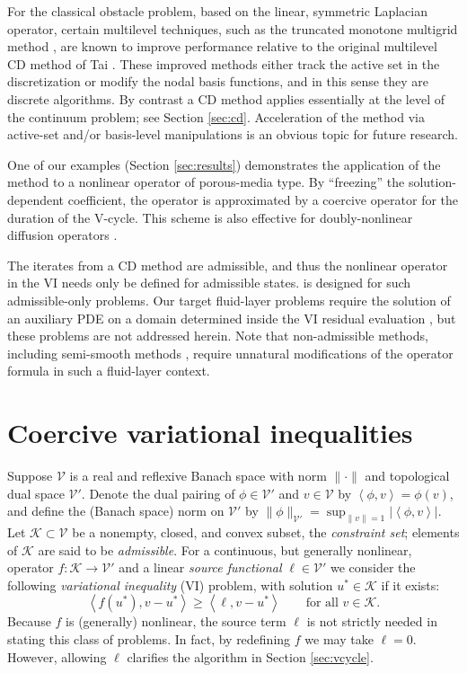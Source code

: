 \documentclass[letterpaper,final,12pt,reqno]{amsart}
\theoremstyle{cstyle}
\theoremstyle{cstyle*}
\theoremstyle{dstyle}
\numberwithin{equation}{section}
\numberwithin{figure}{section}
\numberwithin{table}{section}
\numberwithin{theorem}{section}
\newcommand{\cK}{\mathcal{K}}
\newcommand{\cV}{\mathcal{V}}
\newcommand{\ip}[2]{\left<#1,#2\right>}
\begin{document}
For the classical obstacle problem, based on the linear, symmetric Laplacian operator, certain multilevel techniques, such as the truncated monotone multigrid method \cite{GraeserKornhuber2009,Kornhuber1994}, are known to improve performance relative to the original multilevel CD method of Tai \cite{Tai2003}.  These improved methods either track the active set in the discretization or modify the nodal basis functions, and in this sense they are discrete algorithms.  By contrast a CD method applies essentially at the level of the continuum problem; see Section \ref{sec:cd}.  Acceleration of the  method via active-set and/or basis-level manipulations is an obvious topic for future research.

One of our examples (Section \ref{sec:results}) demonstrates the application of the  method to a nonlinear operator of porous-media type.  By ``freezing'' the solution-dependent coefficient, the operator is approximated by a coercive operator for the duration of the V-cycle.  This scheme is also effective for doubly-nonlinear diffusion operators \cite[for example]{Bueler2021conservation,Calvoetal2002}.

The iterates from a CD method are admissible, and thus the nonlinear operator in the VI needs only be defined for admissible states.   is designed for such admissible-only problems.  Our target fluid-layer problems require the solution of an auxiliary PDE on a domain determined inside the VI residual evaluation \cite{Bueler2021conservation}, but these problems are not addressed herein.  Note that non-admissible methods, including semi-smooth methods \cite{BensonMunson2006}, require unnatural modifications of the operator formula in such a fluid-layer context.


\section{Coercive variational inequalities} \label{sec:vi}

Suppose $\cV$ is a real and reflexive Banach space with norm $\|\cdot\|$ and topological dual space $\cV'$.  Denote the dual pairing of $\phi \in \cV'$ and $v\in\cV$ by $\ip{\phi}{v} = \phi(v)$, and define the (Banach space) norm on $\cV'$ by $\|\phi\|_{\cV'} = \sup_{\|v\|=1} |\ip{\phi}{v}|$.  Let $\cK \subset \cV$ be a nonempty, closed, and convex subset, the \emph{constraint set}; elements of $\cK$ are said to be \emph{admissible}.  For a continuous, but generally nonlinear, operator $f:\cK \to \cV'$ and a linear \emph{source functional} $\ell\in \cV'$ we consider the following \emph{variational inequality} (VI) problem, with solution $u^*\in \cK$ if it exists:
\begin{equation}
\ip{f(u^*)}{v-u^*} \ge \ip{\ell}{v-u^*} \qquad \text{for all } v\in \cK. \label{eq:vi}
\end{equation}
Because $f$ is (generally) nonlinear, the source term $\ell$ is not strictly needed in stating this class of problems.  In fact, by redefining $f$ we may take $\ell=0$.  However, allowing $\ell$ clarifies the algorithm in Section \ref{sec:vcycle}.
\end{document}
